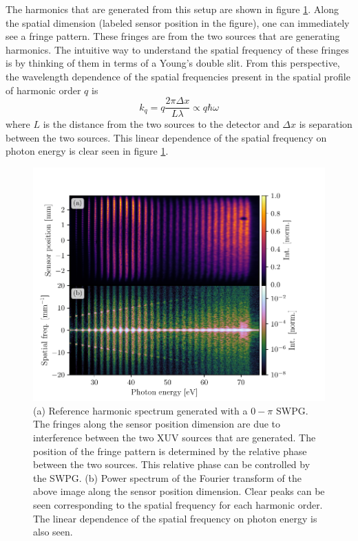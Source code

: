 The harmonics that are generated from this setup are shown in figure \ref{fig:ref_img_pow_spec}. Along the spatial dimension (labeled sensor position in the figure), one can immediately see a fringe pattern.  These fringes are from the two sources that are generating harmonics.  The intuitive way to understand the spatial frequency of these fringes is by thinking of them in terms of a Young's double slit.  From this perspective, the wavelength dependence of the spatial frequencies present in the spatial profile of harmonic order $q$ is
\begin{equation}
	k_q=q\frac{2\pi \Delta x}{L \lambda}\propto q\hbar\omega
\end{equation} 
where $L$ is the distance from the two sources to the detector and $\Delta x$ is separation between the two sources.  This linear dependence of the spatial frequency on photon energy is clear seen in figure \ref{fig:ref_img_pow_spec}.
\begin{figure}
	\centering
	\includegraphics[width=1.0\textwidth]{figures/Two_source/ref_img_pow_spec.pdf}
	\caption[Harmonic spectrum generated by two sources and its corresponding Fourier transform along the spatial dimension]{(a) Reference harmonic spectrum generated with a $0-\pi$ SWPG. The fringes along the sensor position dimension are due to interference between the two XUV sources that are generated.  The position of the fringe pattern is determined by the relative phase between the two sources.  This relative phase can be controlled by the SWPG. (b) Power spectrum of the Fourier transform of the above image along the sensor position dimension. Clear peaks can be seen corresponding to the spatial frequency for each harmonic order.  The linear dependence of the spatial frequency on photon energy is also seen.}
	\label{fig:ref_img_pow_spec}
\end{figure}

